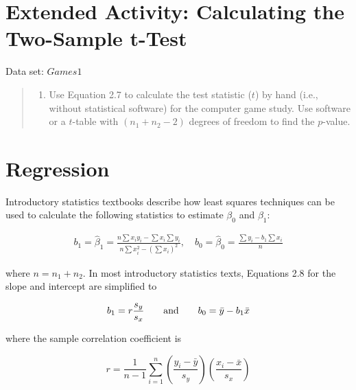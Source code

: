 \documentclass[
]{report}
\providecommand{\tightlist}{%
  \setlength{\itemsep}{0pt}\setlength{\parskip}{0pt}}
\begin{document}
\hypertarget{extended-activity-calculating-the-two-sample-t-test}{%
\section*{Extended Activity: Calculating the Two-Sample t-Test}\label{extended-activity-calculating-the-two-sample-t-test}}

Data set: \(Games1\)

\begin{quote}
\begin{enumerate}
\def\labelenumi{\arabic{enumi}.}
\setcounter{enumi}{33}
\tightlist
\item
  Use Equation 2.7 to calculate the test statistic (\(t\)) by hand (i.e., without statistical software) for the computer game study. Use software or a \(t\)-table with \((n_1 + n_2 - 2)\) degrees of freedom to find the \(p\)-value.
\end{enumerate}
\end{quote}

\hypertarget{regression}{%
\section*{Regression}\label{regression}}

Introductory statistics textbooks describe how least squares techniques can be used to calculate the following statistics to estimate \(\beta_0\) and \(\beta_1\):

\begin{align} \label{2.8}
b_1 = \hat{\beta}_1 = \frac{n\sum x_i y_i - \sum x_i \sum y_i}{n\sum x_i^2 - (\sum x_i)^2}, \quad
b_0 = \hat{\beta}_0 = \frac{\sum y_i - b_1 \sum x_i}{n}
\tag{2.8}
\end{align}

where \(n = n_1 + n_2\). In most introductory statistics texts, Equations 2.8 for the slope and intercept are simplified to

\begin{align}
b_1 = r \frac{s_y}{s_x}
\qquad \text{and} \qquad
b_0 = \bar{y} - b_1 \bar{x} 
\notag
\end{align}

where the sample correlation coefficient is

\[
r = \frac{1}{n - 1} \sum_{i=1}^{n} \left(\frac{y_i - \bar{y}}{s_y}\right) \left(\frac{x_i - \bar{x}}{s_x}\right)
\]
\end{document}
